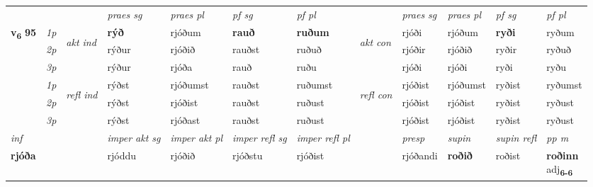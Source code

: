 \begin{longtable}[l]{X>{\footnotesize\itshape}llXXXXlXXXX}
\midrule

 & &   & \textit{praes sg}  & \textit{praes pl}    & \textit{ pf sg} & \textit{pf pl} & & \textit{praes sg}  & \textit{praes pl}    & \textit{pf sg} & \textit{pf pl }  \\ \cmidrule{4-7} \cmidrule{9-12}
 \multirow{2}{*}{{{\textbf{v{\textsubscript{6}}} \Large{\textbf{95}}}}}  & 1p & \multirow{3}{*}{\begin{turn}{90}\textit{akt ind}\end{turn}} & \textbf{rýð} & rjóðum & \textbf{rauð} & \textbf{ruðum} & \multirow{3}{*}{\begin{turn}{90}\textit{akt con}\end{turn}} &rjóði & rjóðum & \textbf{ryði} & ryðum\\*
 & 2p &  &  rýður  & rjóðið & rauðst & ruðuð & & rjóðir & rjóðið & ryðir & ryðuð \\*
 & 3p &  & rýður & rjóða & rauð & ruðu & & rjóði & rjóði& ryði & ryðu \\*
\cmidrule{4-7} \cmidrule{9-12}
 & 1p & \multirow{3}{*}{\begin{turn}{90}\textit{refl ind}\end{turn}}  & rýðst & rjóðumst & rauðst & ruðumst & \multirow{3}{*}{\begin{turn}{90}\textit{refl con}\end{turn}}  &rjóðist & rjóðumst & ryðist & ryðumst \\*
 & 2p &  & rýðst & rjóðist & rauðst & ruðust & &rjóðist & rjóðist & ryðist & ryðust \\*
 & 3p  & & rýðst & rjóðast & rauðst & ruðust & & rjóðist & rjóðist& ryðist & ryðust \\*
\cmidrule{4-7} \cmidrule{9-12}

   {\textit{inf}} & &  & \textit{imper akt sg} & \textit{imper akt pl} & \textit{imper refl sg} & \textit{imper refl pl} && \textit{presp} & \textit{supin} & \textit{supin refl} & \textit{pp m} \\*
  {\textbf{rjóða}} & && rjóddu  & rjóðið & rjóðstu & rjóðist && rjóðandi &  \textbf{roðið} & roðist & \specialcell{\textbf{roðinn} \\ adj\textbf{\textsubscript{6-6}}} \\*

\midrule


\end{longtable}
